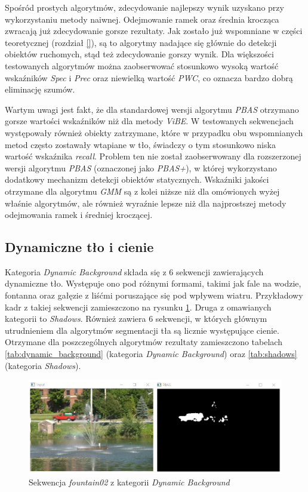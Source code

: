 Spośród prostych algorytmów, zdecydowanie najlepszy wynik uzyskano przy wykorzystaniu metody naiwnej. Odejmowanie ramek oraz średnia krocząca zwracają już zdecydowanie gorsze rezultaty. Jak zostało już wspomniane w części teoretycznej (rozdział \ref{}), są to algorytmy nadające się głównie do detekcji obiektów ruchomych, stąd też zdecydowanie gorszy wynik. Dla większości testowanych algorytmów można zaobserwować stosunkowo wysoką wartość wskaźników \textit{Spec} i \textit{Prec} oraz niewielką wartość \textit{PWC}, co oznacza bardzo dobrą eliminację szumów. 

Wartym uwagi jest fakt, że dla standardowej wersji algorytmu \textit{PBAS} otrzymano gorsze wartości wskaźników niż dla metody \textit{ViBE}.   W testowanych sekwencjach występowały również obiekty zatrzymane, które w przypadku obu wspomnianych metod często zostawały wtapiane w tło, świadczy o tym stosunkowo niska wartość wskaźnika \textit{recall}. Problem ten nie został zaobserwowany dla rozszerzonej wersji algorytmu \textit{PBAS} (oznaczonej jako \textit{PBAS+}), w której wykorzystano dodatkowy mechanizm detekcji obiektów statycznych. Wskaźniki jakości otrzymane dla algorytmu \textit{GMM} są z kolei niższe niż dla omówionych wyżej właśnie algorytmów, ale również wyraźnie lepsze niż dla najprostszej metody odejmowania ramek i średniej kroczącej. 


\subsection{Dynamiczne tło i cienie}
\label{subsec:dynamiczne_tlo_cienie}

Kategoria \textit{Dynamic Background} składa się z 6 sekwencji zawierających dynamiczne tło. Występuje ono pod różnymi formami, takimi jak fale na wodzie, fontanna oraz gałęzie z liśćmi poruszające się pod wpływem wiatru. Przykładowy kadr z takiej sekwencji zamieszczono na rysunku \ref{fig:dynamic_example}. Druga z omawianych kategorii to \textit{Shadows}. Również zawiera 6 sekwencji, w których głównym utrudnieniem dla algorytmów segmentacji tła są licznie występujące cienie. Otrzymane dla poszczególnych algorytmów rezultaty zamieszczono tabelach \ref{tab:dynamic_background} (kategoria \textit{Dynamic Background}) oraz \ref{tab:shadows} (kategoria \textit{Shadows}).

    \begin{figure}[h]
			\centering
			\includegraphics[scale=0.65]{img/5/dynamic_example.png}
			\caption{Sekwencja \textit{fountain02} z kategorii \textit{Dynamic Background}}
			\label{fig:dynamic_example}
	\end{figure}

